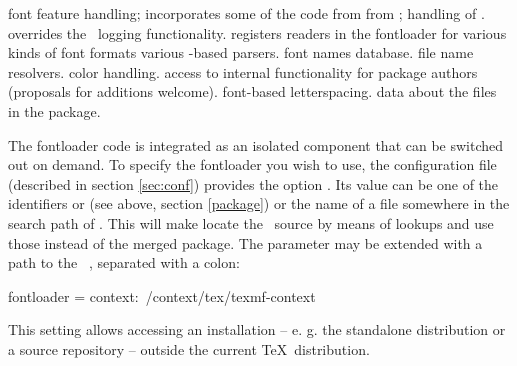 \beginfilelist
      font feature handling; incorporates some of the code from
       from \ConTeXt;
    \endaltitem
      handling of .
    \endaltitem
      overrides the \ConTeXt\ logging functionality.
    \endaltitem
      registers readers in the fontloader for various kinds of
      font formats
    \endaltitem
      various -based parsers.
    \endaltitem
      font names database.
    \endaltitem
      file name resolvers.
    \endaltitem
      color handling.
    \endaltitem
      access to internal functionality for package authors (proposals
      for additions welcome).
    \endaltitem
      font-based letterspacing.
    \endaltitem
      data about the files in the package.
    \endaltitem
\endfilelist


\endsubsection


\label{sec:pkg}%
The fontloader code is integrated as an isolated component that can be
switched out on demand.
%
To specify the fontloader you wish to use, the configuration file
(described in section \ref{sec:conf}) provides the option
.
%
Its value can be one of the identifiers  or
 (see above, section \ref{package}) or the name
of a file somewhere in the search path of \LuaTeX.
%
This will make  locate the \ConTeXt\ source by
means of  lookups and use those instead of the
merged package.
%
The parameter may be extended with a path to the \ConTeXt\
, separated with a colon:

\beginlisting
[run]
  fontloader = context:~/context/tex/texmf-context
\endlisting

\noindent This setting allows accessing an installation -- e. g. the
standalone distribution or a source repository -- outside the current
\TeX\ distribution.

